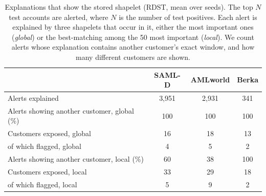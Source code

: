\begin{table}[H]
\caption{Explanations that show the stored shapelet (RDST, mean over seeds). The top $N$ test accounts are alerted, where $N$ is the number of test positives. Each alert is explained by three shapelets that occur in it, either the most important ones (\emph{global}) or the best-matching among the 50 most important (\emph{local}). We count alerts whose explanation contains another customer's exact window, and how many different customers are shown.}
\label{tab:expl}
\small\setlength{\tabcolsep}{2.5pt}
\centering
\begin{tabular}{lccc}
\toprule
& SAML-D & AMLworld & Berka \\
\midrule
Alerts explained & 3,951 & 2,931 & 341 \\
Alerts showing another customer, global (\%) & 100 & 100 & 100 \\
Customers exposed, global & 16 & 18 & 13 \\
\quad of which flagged, global & 4 & 5 & 2 \\
Alerts showing another customer, local (\%) & 60 & 38 & 100 \\
Customers exposed, local & 33 & 29 & 18 \\
\quad of which flagged, local & 5 & 9 & 2 \\
\bottomrule\end{tabular}\end{table}
